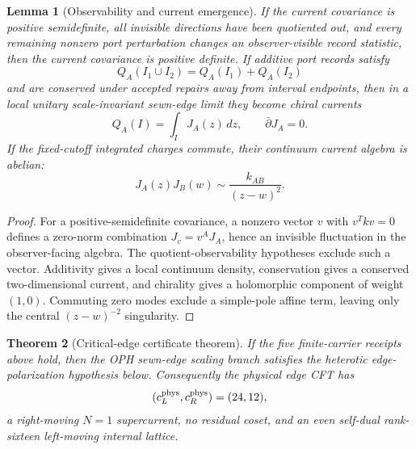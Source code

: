 \documentclass[11pt]{article}
\newtheorem{theorem}{Theorem}[section]
\newtheorem{lemma}[theorem]{Lemma}
\theoremstyle{remark}
\theoremstyle{plain}
\begin{document}
\begin{lemma}[Observability and current emergence]
If the current covariance is positive semidefinite, all invisible directions have been quotiented
out, and every remaining nonzero port perturbation changes an observer-visible record statistic,
then the current covariance is positive definite. If additive port records satisfy
\[
Q_A(I_1\cup I_2)=Q_A(I_1)+Q_A(I_2)
\]
and are conserved under accepted repairs away from interval endpoints, then in a local unitary
scale-invariant sewn-edge limit they become chiral currents
\[
Q_A(I)=\int_I J_A(z)\,dz,
\qquad
\bar\partial J_A=0.
\]
If the fixed-cutoff integrated charges commute, their continuum current algebra is abelian:
\[
J_A(z)J_B(w)\sim\frac{k_{AB}}{(z-w)^2}.
\]
\end{lemma}

\begin{proof}
For a positive-semidefinite covariance, a nonzero vector \(v\) with \(v^Tkv=0\) defines a zero-norm
combination \(J_v=v^AJ_A\), hence an invisible fluctuation in the observer-facing algebra. The
quotient-observability hypotheses exclude such a vector. Additivity gives a local continuum
density, conservation gives a conserved two-dimensional current, and chirality gives a holomorphic
component of weight \((1,0)\). Commuting zero modes exclude a simple-pole affine term, leaving only
the central \((z-w)^{-2}\) singularity.
\end{proof}

\begin{theorem}[Critical-edge certificate theorem]
If the five finite-carrier receipts above hold, then the OPH sewn-edge scaling branch satisfies the
heterotic edge-polarization hypothesis below. Consequently the physical edge CFT has
\[
(c_L^{\rm phys},c_R^{\rm phys})=(24,12),
\]
a right-moving \(N=1\) supercurrent, no residual coset, and an even self-dual rank-sixteen
left-moving internal lattice.
\end{theorem}
\end{document}
